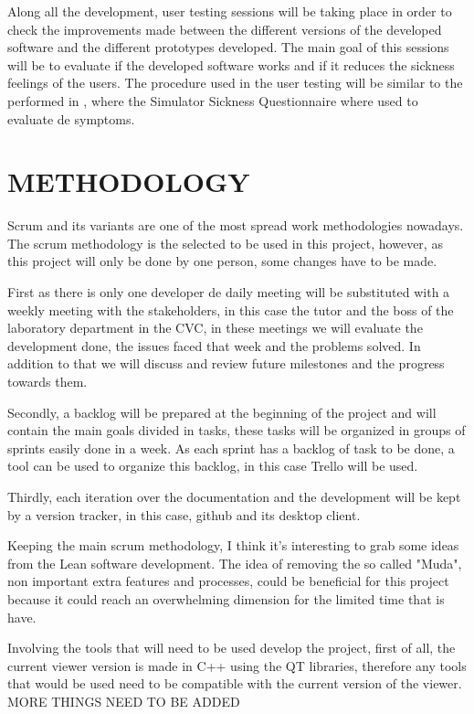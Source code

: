 \documentclass[10pt,a4paper,twocolumn,twoside]{article}
\begin{document}
Along all the development, user testing sessions will be taking place in order to check the improvements made between the different versions of the developed software and the different prototypes developed. The main goal of this sessions will be to evaluate if the developed software works and if it reduces the sickness feelings of the users. The procedure used in the user testing will be similar to the performed in \cite{ifftConfortDoF}, where the Simulator Sickness Questionnaire\cite{ssqQuestion} where used to evaluate de symptoms. 

\section{METHODOLOGY}
Scrum and its variants are one of the most spread work methodologies nowadays.
The scrum methodology is the selected to be used in this project, however, as this project will only be done by one person, some changes have to be made. 

First as there is only one developer de daily meeting will be substituted with a weekly meeting with the stakeholders, in this case the tutor and the boss of the laboratory department in the CVC, in these meetings we will evaluate the development done, the issues faced that week and the problems solved. In addition to that we will discuss and review future milestones and the progress towards them.

Secondly, a backlog will be prepared at the beginning of the project and will contain the main goals divided in tasks, these tasks will be organized in groups of sprints easily done in a week. As each sprint has a backlog of task to be done, a tool can be used to organize this backlog, in this case Trello\cite{trello} will be used.

Thirdly, each iteration over the documentation and the development will be kept by a version tracker, in this case, github\cite{github} and its desktop client\cite{githubDesktop}. 

Keeping the main scrum methodology, I think it's interesting to grab some ideas from the Lean software development\cite{leanMethod}. The idea of removing the so called "Muda", non important extra features and processes, could be beneficial for this project because it could reach an overwhelming dimension for the limited time that is have.


Involving the tools that will need to be used develop the project, first of all, the current viewer version is made in C++ using the QT libraries\cite{qt}, therefore any tools that would be used need to be compatible with the current version of the viewer. MORE THINGS NEED TO BE ADDED
\end{document}
